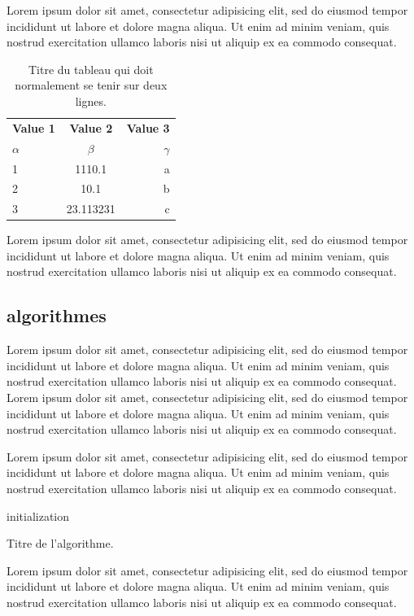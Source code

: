 Lorem ipsum dolor sit amet, consectetur adipisicing elit, sed do eiusmod
tempor incididunt ut labore et dolore magna aliqua. Ut enim ad minim veniam,
quis nostrud exercitation ullamco laboris nisi ut aliquip ex ea commodo
consequat.

\begin{table}[H]
  \begin{center}
    \caption{Titre du tableau qui doit normalement se tenir sur deux lignes.}
    \label{tab:table1}
    \begin{tabular}{l|c|r}
      \textbf{Value 1} & \textbf{Value 2} & \textbf{Value 3}\\
      $\alpha$ & $\beta$ & $\gamma$ \\
      \hline
      1 & 1110.1 & a\\
      2 & 10.1 & b\\
      3 & 23.113231 & c\\
    \end{tabular}
  \end{center}
\end{table}

Lorem ipsum dolor sit amet, consectetur adipisicing elit, sed do eiusmod
tempor incididunt ut labore et dolore magna aliqua. Ut enim ad minim veniam,
quis nostrud exercitation ullamco laboris nisi ut aliquip ex ea commodo
consequat.

\subsection{algorithmes}

Lorem ipsum dolor sit amet, consectetur adipisicing elit, sed do eiusmod
tempor incididunt ut labore et dolore magna aliqua. Ut enim ad minim veniam,
quis nostrud exercitation ullamco laboris nisi ut aliquip ex ea commodo
consequat. Lorem ipsum dolor sit amet, consectetur adipisicing elit, sed do eiusmod
tempor incididunt ut labore et dolore magna aliqua. Ut enim ad minim veniam,
quis nostrud exercitation ullamco laboris nisi ut aliquip ex ea commodo
consequat.

Lorem ipsum dolor sit amet, consectetur adipisicing elit, sed do eiusmod
tempor incididunt ut labore et dolore magna aliqua. Ut enim ad minim veniam,
quis nostrud exercitation ullamco laboris nisi ut aliquip ex ea commodo
consequat.

\begin{algorithm}[H]
initialization\;
\caption{Titre de l'algorithme.}
\label{algo:algo_1}
\end{algorithm}

Lorem ipsum dolor sit amet, consectetur adipisicing elit, sed do eiusmod
tempor incididunt ut labore et dolore magna aliqua. Ut enim ad minim veniam,
quis nostrud exercitation ullamco laboris nisi ut aliquip ex ea commodo
consequat.
